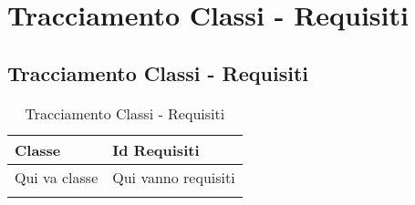 \section{Tracciamento Classi - Requisiti}
\subsection{Tracciamento Classi - Requisiti}
\normalsize
\begin{longtable}{|>{\centering}m{5cm}|m{5cm}<{\centering}|}
\hline 

\textbf{Classe} & \textbf{Id Requisiti}\\
\hline
\endhead
Qui va classe & Qui vanno requisiti\\
\hline

\caption[Tracciamento Classi - Requisiti]{Tracciamento Classi - Requisiti}
\label{tabella: Tracciamento Classi - Requisiti}
\end{longtable}
\newpage